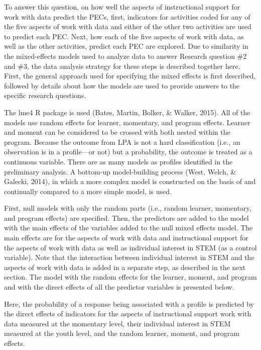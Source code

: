 \documentclass[]{msu-thesis}
\theoremstyle{definition}
\theoremstyle{definition}
\theoremstyle{definition}
\theoremstyle{remark}
\begin{document}
To answer this question, on how well the aspects of instructional
support for work with data predict the PECs, first, indicators for
activities coded for any of the five aspects of work with data and
either of the other two activities are used to predict each PEC. Next,
how each of the five aspects of work with data, as well as the other
activities, predict each PEC are explored. Due to similarity in the
mixed-effects models used to analyze data to answer Research question
\#2 and \#3, the data analysis strategy for these steps is described
together here. First, the general approach used for specifying the mixed
effects is first described, followed by details about how the models are
used to provide answers to the specific research questions.

The lme4 R package is used (Bates, Martin, Bolker, \& Walker, 2015). All
of the models use random effects for learner, momentary, and program
effects. Learner and moment can be considered to be crossed with both
nested within the program. Because the outcome from LPA is not a hard
classification (i.e., an observation is in a profile---or not) but a
probability, the outcome is treated as a continuous variable. There are
as many models as profiles identified in the preliminary analysis. A
bottom-up model-building process (West, Welch, \& Galecki, 2014), in
which a more complex model is constructed on the basis of and
continually compared to a more simple model, is used.

First, null models with only the random parts (i.e., random learner,
momentary, and program effects) are specified. Then, the predictors are
added to the model with the main effects of the variables added to the
null mixed effects model. The main effects are for the aspects of work
with data and instructional support for the aspects of work with data as
well as individual interest in STEM (as a control variable). Note that
the interaction between individual interest in STEM and the aspects of
work with data is added in a separate step, as described in the next
section. The model with the random effects for the learner, moment, and
program and with the direct effects of all the predictor variables is
presented below.

Here, the probability of a response being associated with a profile is
predicted by the direct effects of indicators for the aspects of
instructional support work with data measured at the momentary level,
their individual interest in STEM measured at the youth level, and the
random learner, moment, and program effects.
\end{document}
